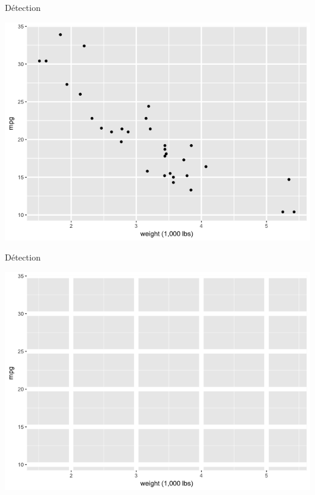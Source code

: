 \documentclass[french]{beamer}
\begin{document}
\begin{frame}{Détection}
\begin{center}
	\includegraphics[height=0.8\textheight]{det5}
\end{center}
\end{frame}

\begin{frame}{Détection}
\begin{center}
	\includegraphics[height=0.8\textheight]{det6}
\end{center}
\end{frame}
\end{document}
